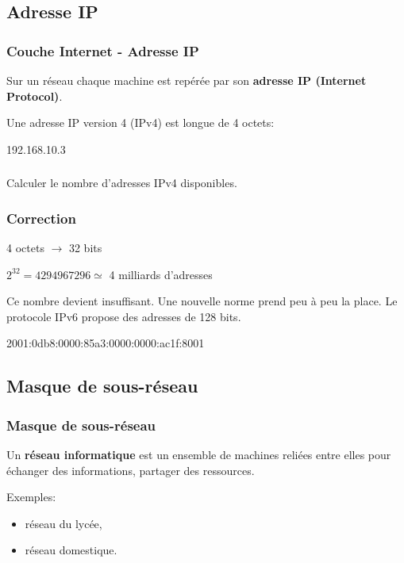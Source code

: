 \documentclass[svgnames,11pt]{beamer}
\begin{document}
\subsection{Adresse IP}
\begin{frame}
    \frametitle{Couche Internet - Adresse IP}
    \begin{aretenir}[]
        Sur un réseau chaque machine est repérée par son \textbf{adresse IP (Internet Protocol)}.
    \end{aretenir}
    Une adresse IP version 4 (IPv4) est longue de 4 octets:
    \begin{center}
        \large{192.168.10.3}
    \end{center}

\end{frame}
\begin{frame}
    \frametitle{}

    \begin{activite}
        Calculer le nombre d'adresses IPv4 disponibles.
    \end{activite}

\end{frame}
\begin{frame}
    \frametitle{Correction}

    4 octets $\rightarrow$ 32 bits
    \begin{center}
        $2^{32} = 4 294 967 296 \simeq $ 4 milliards d'adresses
    \end{center}
    \begin{aretenir}[Remarque]
        Ce nombre devient insuffisant. Une nouvelle norme prend peu à peu la place. Le protocole IPv6 propose des adresses de 128 bits.
        \begin{center}
            2001:0db8:0000:85a3:0000:0000:ac1f:8001
        \end{center}
    \end{aretenir}
\end{frame}
\subsection{Masque de sous-réseau}
\begin{frame}
    \frametitle{Masque de sous-réseau}
    \begin{aretenir}[]
        Un \textbf{réseau informatique} est un ensemble de machines reliées entre elles pour échanger des informations, partager des ressources.
    \end{aretenir}
    Exemples:

    \begin{itemize}
        \item réseau du lycée,
        \item réseau domestique.
    \end{itemize}
\end{frame}
\end{document}
